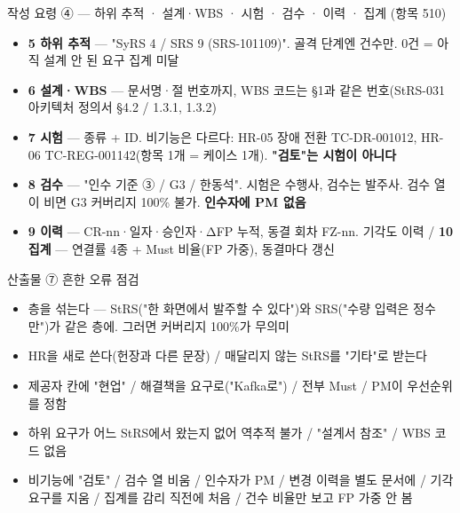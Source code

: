 \begin{frame}{작성 요령 ④ — 하위 추적 · 설계·WBS · 시험 · 검수 · 이력 · 집계 (항목 5\til{}10)}
\begin{itemize}
\item \textbf{5 하위 추적} — "SyRS 4 / SRS 9 (SRS-101\til{}109)". 골격 단계엔 건수만. 0건 = 아직 설계 안 된 요구 \ra{} 집계 미달
\item \textbf{6 설계·WBS} — 문서명·절 번호까지, WBS 코드는 §1과 같은 번호(StRS-031 \ra{} 아키텍처 정의서 §4.2 / 1.3.1, 1.3.2)
\item \textbf{7 시험} — 종류 + ID. 비기능은 다르다: HR-05 \ra{} 장애 전환 TC-DR-001\til{}012, HR-06 \ra{} TC-REG-001\til{}142(항목 1개 = 케이스 1개). \textbf{"검토"는 시험이 아니다}
\item \textbf{8 검수} — "인수 기준 ③ / G3 / 한동석". 시험은 수행사, 검수는 발주사. 검수 열이 비면 G3 커버리지 100\% 불가. \textbf{인수자에 PM 없음}
\item \textbf{9 이력} — CR-nn·일자·승인자·ΔFP 누적, 동결 회차 FZ-nn. 기각도 이력 / \textbf{10 집계} — 연결률 4종 + Must 비율(FP 가중), 동결마다 갱신
\end{itemize}
\end{frame}

\begin{frame}{산출물 ⑦ 흔한 오류 점검}
\begin{itemize}
\item 층을 섞는다 — StRS("한 화면에서 발주할 수 있다")와 SRS("수량 입력은 정수만")가 같은 층에. 그러면 커버리지 100\%가 무의미
\item HR을 새로 쓴다(헌장과 다른 문장) / 매달리지 않는 StRS를 "기타"로 받는다
\item 제공자 칸에 "현업" / 해결책을 요구로("Kafka로") / 전부 Must / PM이 우선순위를 정함
\item 하위 요구가 어느 StRS에서 왔는지 없어 역추적 불가 / "설계서 참조" / WBS 코드 없음
\item 비기능에 "검토" / 검수 열 비움 / 인수자가 PM / 변경 이력을 별도 문서에 / 기각 요구를 지움 / 집계를 감리 직전에 처음 / 건수 비율만 보고 FP 가중 안 봄
\end{itemize}
\end{frame}

